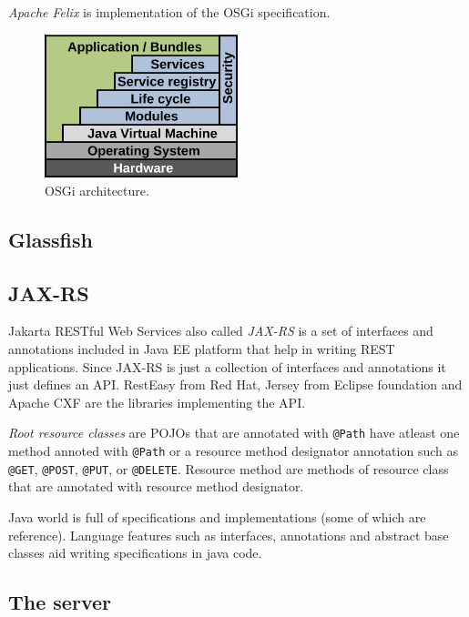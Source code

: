 \documentclass[a4paper]{article}
\begin{document}
\emph{Apache Felix} is implementation of the OSGi specification.

\begin{figure}[hbt]
    \begin{center}
        \includegraphics[width=0.5\textwidth]{graphics/osgi-architecture.png}
        \caption{OSGi architecture.}
    \end{center}
\end{figure}

\subsection*{Glassfish}


\subsection*{JAX-RS}
Jakarta RESTful Web Services also called \emph{JAX-RS} is a set of interfaces and annotations included in Java EE platform 
that help in writing REST applications. Since JAX-RS is just a collection of interfaces and annotations it just defines an API. 
RestEasy from Red Hat, Jersey from Eclipse foundation and Apache CXF are the libraries implementing the API.

\emph{Root resource classes} are POJOs that are annotated with \lstinline{@Path} have atleast one method annoted with
\lstinline{@Path} or a resource method designator annotation such as \lstinline{@GET}, \lstinline{@POST}, \lstinline{@PUT},
or \lstinline{@DELETE}. Resource method are methods of resource class that are annotated with resource method designator.

Java world is full of specifications and implementations (some of which are reference). Language features such as interfaces, 
annotations and abstract base classes aid writing specifications in java code.

\subsection*{The server}
\end{document}
